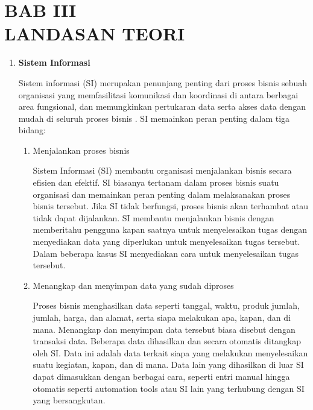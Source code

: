 \documentclass[12pt]{article}
\newcommand{\listsection}[1]{
    \item \textbf{#1}
    \addcontentsline{toc}{subsection}{#1}
}
\begin{document}
\section[BAB III LANDASAN TEORI]{BAB III\\LANDASAN TEORI}
\setcounter{table}{0}
\setcounter{figure}{0}



\begin{enumerate}[label=\textbf{3.\arabic*}]
    \listsection{Sistem Informasi}
    
    Sistem informasi (SI) merupakan penunjang penting dari proses bisnis sebuah organisasi yang memfasilitasi komunikasi dan koordinasi di antara berbagai area fungsional, dan memungkinkan pertukaran data serta akses data dengan mudah di seluruh proses bisnis \cite{rainer2004}. SI memainkan peran penting dalam tiga bidang:

    \begin{enumerate}[label=\arabic*.]
        \item Menjalankan proses bisnis
        
        Sistem Informasi (SI) membantu organisasi menjalankan bisnis secara efisien dan efektif. SI biasanya tertanam dalam proses bisnis suatu organisasi dan memainkan peran penting dalam melaksanakan proses bisnis tersebut. Jika SI tidak berfungsi, proses bisnis akan terhambat atau tidak dapat dijalankan. SI membantu menjalankan bisnis dengan memberitahu pengguna kapan saatnya untuk menyelesaikan tugas dengan menyediakan data yang diperlukan untuk menyelesaikan tugas tersebut. Dalam beberapa kasus SI menyediakan cara untuk menyelesaikan tugas tersebut.


        \item Menangkap dan menyimpan data yang sudah diproses 
        
        Proses bisnis menghasilkan data seperti tanggal, waktu, produk jumlah, jumlah, harga, dan alamat, serta siapa melakukan apa, kapan, dan di mana. Menangkap dan menyimpan data tersebut biasa disebut dengan transaksi data. Beberapa data dihasilkan dan secara otomatis ditangkap oleh SI. Data ini adalah data terkait siapa yang melakukan menyelesaikan suatu kegiatan, kapan, dan di mana. Data lain yang dihasilkan di luar SI dapat dimasukkan dengan berbagai cara, seperti entri manual hingga otomatis seperti automation tools atau SI lain yang terhubung dengan SI yang bersangkutan.


\end{enumerate}
\end{enumerate}
\end{document}
